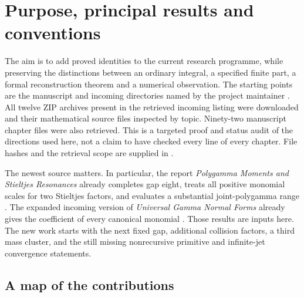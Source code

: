 \section{Purpose, principal results and conventions}
\label{intro:section}

The aim is to add proved identities to the current research programme,
while preserving the distinctions between an ordinary integral, a specified
finite part, a formal reconstruction theorem and a numerical observation.
The starting points are the manuscript and incoming directories named by
the project maintainer \cite{RepoManuscript,RepoIncoming}. All twelve ZIP
archives present in the retrieved incoming listing were downloaded and
their mathematical source files inspected by topic. Ninety-two manuscript
chapter files were also retrieved. This is a targeted proof and status
audit of the directions used here, not a claim to have checked every line
of every chapter. File hashes and the retrieval scope are supplied in
.

The newest source matters. In particular, the report
\emph{Polygamma Moments and Stieltjes Resonances} already completes gap
eight, treats all positive monomial scales for two Stieltjes factors,
and evaluates a substantial joint-polygamma range
\cite{PolygammaResonances}. The expanded incoming version of
\emph{Universal Gamma Normal Forms} already gives the coefficient of
every canonical monomial \cite{UniversalIncoming}. Those results are
inputs here. The new work starts with the next fixed gap, additional
collision factors, a third mass cluster, and the still missing
nonrecursive primitive and infinite-jet convergence statements.

\subsection{A map of the contributions}

